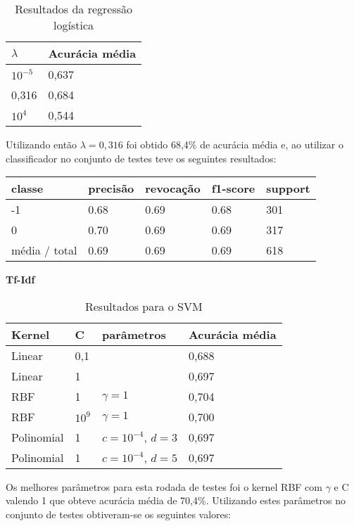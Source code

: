 \begin{table}[H]
	\centering
	\caption{Resultados da regressão logística}
	\begin{tabular}{l l}
		\hline
		$\lambda$ & Acurácia média \\
		\hline
		$10^{-5}$ & 0,637 \\
		\hline
		0,316 & 0,684 \\
		\hline
		$10^{4}$ & 0,544 \\
	\end{tabular}
\end{table}

Utilizando então $\lambda = 0,316$ foi obtido 68,4\% de acurácia média e, ao utilizar
o classificador no conjunto de testes teve os seguintes resultados:

\begin{table}[H]
	\centering
		\begin{tabular}{l | l | l | l | l}
		\hline
		classe  	&	precisão  &  revocação &  f1-score &  support \\
		\hline
		 -1    &   0.68   &   0.69   &   0.68   &    301 \\
		 \hline
          0    &   0.70   &   0.69   &   0.69   &    317 \\
		\hline
		média / total   &    0.69   &   0.69   &   0.69   &    618 \\
		\hline
	\end{tabular}
\end{table}

\textbf{Tf-Idf}

\begin{table}[H]
	\centering
	\caption{Resultados para o SVM}
	\begin{tabular}{l l l l}
		\hline
		Kernel & C & parâmetros & Acurácia média \\
		\hline
		Linear & 0,1 & & 0,688 \\
		\hline
		Linear & 1 & & 0,697 \\
		\hline
		RBF & 1 & $\gamma = 1$ & 0,704 \\
		\hline
		RBF & $10^{9}$ & $\gamma = 1$ & 0,700 \\
		\hline
		Polinomial & 1 & $c = 10^{-4}$, $d = 3$ & 0,697 \\
		\hline
		Polinomial & 1 & $c = 10^{-4}$, $d = 5$ & 0,697 \\
		\hline
	\end{tabular}
\end{table}

Os melhores parâmetros para esta rodada de testes foi o kernel RBF com $\gamma$ e C valendo 1 que
obteve acurácia média de 70,4\%. Utilizando estes parâmetros no conjunto de testes obtiveram-se os
seguintes valores:

